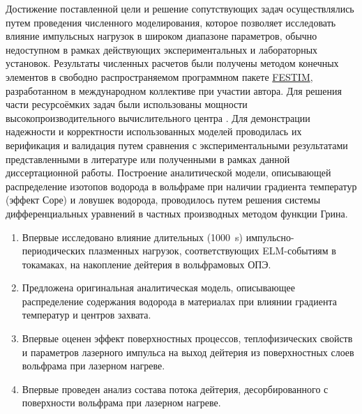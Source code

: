 {\methods} Достижение поставленной цели и решение сопутствующих задач осуществлялись путем проведения численного моделирования, которое позволяет исследовать влияние импульсных нагрузок в широком диапазоне параметров, обычно недоступном в рамках действующих экспериментальных и лабораторных установок. Результаты численных расчетов были получены методом конечных элементов в свободно распространяемом программном пакете \href{https://github.com/festim-dev/FESTIM}{FESTIM}, разработанном в международном коллективе при участии автора. Для решения части ресурсоёмких задач были использованы мощности высокопроизводительного вычислительного центра \thesisOrganizationShort. Для демонстрации надежности и корректности использованных моделей проводилась их верификация и валидация путем сравнения с экспериментальными результатами представленными в литературе или полученными в рамках данной диссертационной работы. Построение аналитической модели, описывающей распределение изотопов водорода в вольфраме при наличии градиента температур (эффект Соре) и ловушек водорода, проводилось путем решения системы дифференциальных уравнений в частных производных методом функции Грина.

{\novelty}
\begin{enumerate}[beginpenalty=10000] %
    \item Впервые исследовано влияние длительных (\SI{1000}{\second}) импульсно-периодических плазменных нагрузок, соответствующих ELM-событиям в токамаках,
          на накопление дейтерия в вольфрамовых ОПЭ.
    \item Предложена оригинальная аналитическая модель, описывающее распределение содержания водорода в материалах при влиянии градиента температур и центров захвата.
    \item Впервые оценен эффект поверхностных процессов, теплофизических свойств и параметров лазерного импульса на выход дейтерия из поверхностных слоев вольфрама при лазерном нагреве.
    \item Впервые проведен анализ состава потока дейтерия, десорбированного с поверхности вольфрама при лазерном нагреве.
\end{enumerate}

